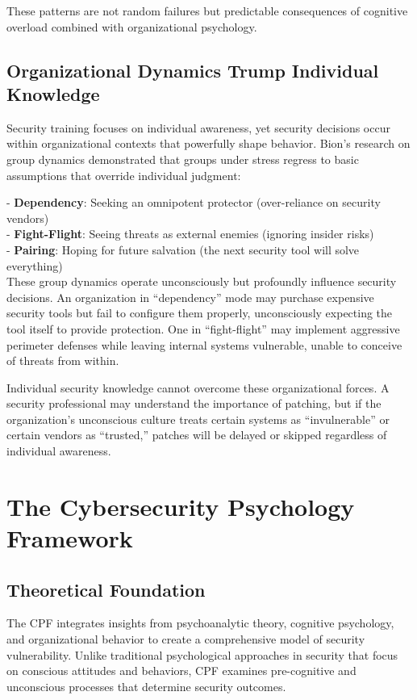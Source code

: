 \documentclass[11pt,a4paper]{article}
\begin{document}
These patterns are not random failures but predictable consequences of cognitive overload combined with organizational psychology.

\subsection{Organizational Dynamics Trump Individual Knowledge}

Security training focuses on individual awareness, yet security decisions occur within organizational contexts that powerfully shape behavior. Bion's research on group dynamics\cite{bion1961} demonstrated that groups under stress regress to basic assumptions that override individual judgment:

- \textbf{Dependency}: Seeking an omnipotent protector (over-reliance on security vendors)\\
- \textbf{Fight-Flight}: Seeing threats as external enemies (ignoring insider risks)\\
- \textbf{Pairing}: Hoping for future salvation (the next security tool will solve everything)\\

These group dynamics operate unconsciously but profoundly influence security decisions. An organization in ``dependency'' mode may purchase expensive security tools but fail to configure them properly, unconsciously expecting the tool itself to provide protection. One in ``fight-flight'' may implement aggressive perimeter defenses while leaving internal systems vulnerable, unable to conceive of threats from within.

Individual security knowledge cannot overcome these organizational forces. A security professional may understand the importance of patching, but if the organization's unconscious culture treats certain systems as ``invulnerable'' or certain vendors as ``trusted,'' patches will be delayed or skipped regardless of individual awareness.

\section{The Cybersecurity Psychology Framework}

\subsection{Theoretical Foundation}

The CPF integrates insights from psychoanalytic theory, cognitive psychology, and organizational behavior to create a comprehensive model of security vulnerability. Unlike traditional psychological approaches in security that focus on conscious attitudes and behaviors, CPF examines pre-cognitive and unconscious processes that determine security outcomes.
\end{document}
